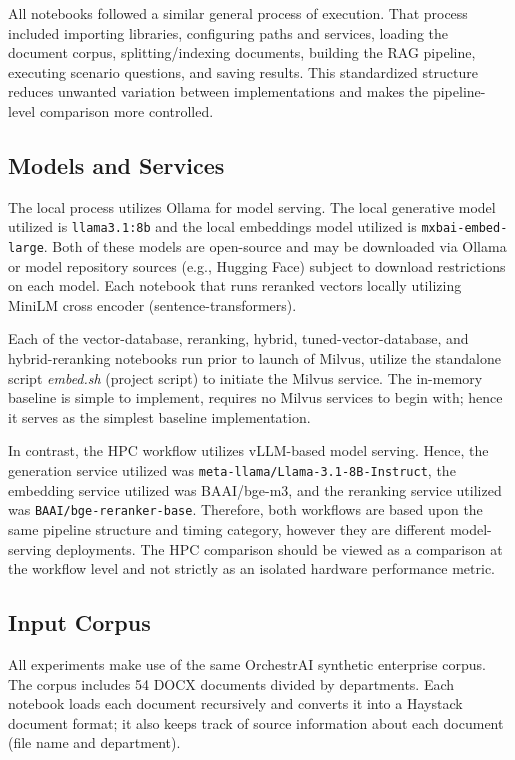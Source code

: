 All notebooks followed a similar general process of execution. That process included importing libraries, configuring paths and services, loading the document corpus, splitting/indexing documents, building the RAG pipeline, executing scenario questions, and saving results. This standardized structure reduces unwanted variation between implementations and makes the pipeline-level comparison more controlled.

\subsection{Models and Services}

The local process utilizes Ollama for model serving. The local generative model utilized is \texttt{llama3.1:8b} and the local embeddings model utilized is \texttt{mxbai-embed-large}. Both of these models are open-source and may be downloaded via Ollama or model repository sources (e.g., Hugging Face) subject to download restrictions on each model. Each notebook that runs reranked vectors locally utilizing \acs{MiniLM} cross encoder (sentence-transformers).

Each of the vector-database, reranking, hybrid, tuned-vector-database, and hybrid-reranking notebooks run prior to launch of Milvus, utilize the standalone script \textit{embed.sh} (project script) to initiate the Milvus service. The in-memory baseline is simple to implement, requires no Milvus services to begin with; hence it serves as the simplest baseline implementation.

In contrast, the \acf{HPC} workflow utilizes \ac{vLLM}-based model serving. Hence, the generation service utilized was \texttt{meta-llama/Llama-3.1-8B-Instruct}, the embedding service utilized was BAAI/bge-m3, and the reranking service utilized was \texttt{BAAI/bge-reranker-base}. Therefore, both workflows are based upon the same pipeline structure and timing category, however they are different model-serving deployments. The \ac{HPC} comparison should be viewed as a comparison at the workflow level and not strictly as an isolated hardware performance metric.

\subsection{Input Corpus}

All experiments make use of the same OrchestrAI synthetic enterprise corpus. The corpus includes 54 DOCX documents divided by departments. Each notebook loads each document recursively and converts it into a Haystack document format; it also keeps track of source information about each document (file name and department).

